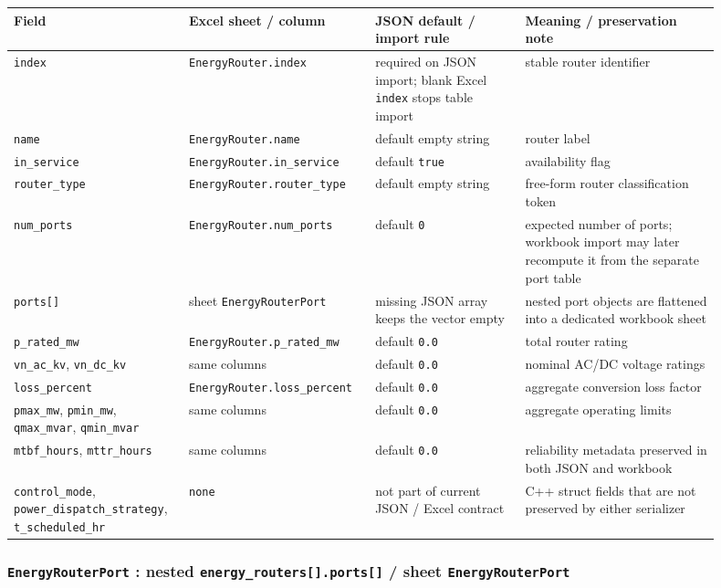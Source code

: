 \begin{longtable}{L{0.20\linewidth}L{0.24\linewidth}L{0.20\linewidth}L{0.26\linewidth}}
\toprule
Field & Excel sheet / column & JSON default / import rule & Meaning / preservation note \\
\midrule
\endhead
\texttt{index} & \texttt{EnergyRouter.index} & required on JSON import; blank Excel \texttt{index} stops table import & stable router identifier \\
\texttt{name} & \texttt{EnergyRouter.name} & default empty string & router label \\
\texttt{in\_service} & \texttt{EnergyRouter.in\_service} & default \texttt{true} & availability flag \\
\texttt{router\_type} & \texttt{EnergyRouter.router\_type} & default empty string & free-form router classification token \\
\texttt{num\_ports} & \texttt{EnergyRouter.num\_ports} & default \texttt{0} & expected number of ports; workbook import may later recompute it from the separate port table \\
\texttt{ports[]} & sheet \texttt{EnergyRouterPort} & missing JSON array keeps the vector empty & nested port objects are flattened into a dedicated workbook sheet \\
\texttt{p\_rated\_mw} & \texttt{EnergyRouter.p\_rated\_mw} & default \texttt{0.0} & total router rating \\
\texttt{vn\_ac\_kv}, \texttt{vn\_dc\_kv} & same columns & default \texttt{0.0} & nominal AC/DC voltage ratings \\
\texttt{loss\_percent} & \texttt{EnergyRouter.loss\_percent} & default \texttt{0.0} & aggregate conversion loss factor \\
\texttt{pmax\_mw}, \texttt{pmin\_mw}, \texttt{qmax\_mvar}, \texttt{qmin\_mvar} & same columns & default \texttt{0.0} & aggregate operating limits \\
\texttt{mtbf\_hours}, \texttt{mttr\_hours} & same columns & default \texttt{0.0} & reliability metadata preserved in both JSON and workbook \\
\texttt{control\_mode}, \texttt{power\_dispatch\_strategy}, \texttt{t\_scheduled\_hr} & \texttt{none} & not part of current JSON / Excel contract & C++ struct fields that are not preserved by either serializer \\
\bottomrule
\end{longtable}

\subsubsection*{\texttt{EnergyRouterPort} : nested \texttt{energy\_routers[].ports[]} / sheet \texttt{EnergyRouterPort}}

